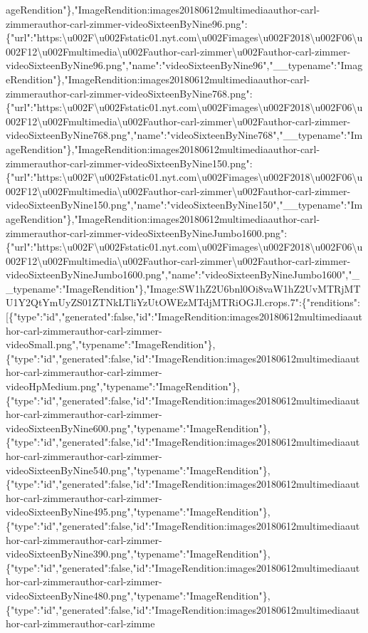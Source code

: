 ageRendition"\},"ImageRendition:images20180612multimediaauthor-carl-zimmerauthor-carl-zimmer-videoSixteenByNine96.png":\{"url":"https:\textbackslash{}u002F\textbackslash{}u002Fstatic01.nyt.com\textbackslash{}u002Fimages\textbackslash{}u002F2018\textbackslash{}u002F06\textbackslash{}u002F12\textbackslash{}u002Fmultimedia\textbackslash{}u002Fauthor-carl-zimmer\textbackslash{}u002Fauthor-carl-zimmer-videoSixteenByNine96.png","name":"videoSixteenByNine96","\_\_typename":"ImageRendition"\},"ImageRendition:images20180612multimediaauthor-carl-zimmerauthor-carl-zimmer-videoSixteenByNine768.png":\{"url":"https:\textbackslash{}u002F\textbackslash{}u002Fstatic01.nyt.com\textbackslash{}u002Fimages\textbackslash{}u002F2018\textbackslash{}u002F06\textbackslash{}u002F12\textbackslash{}u002Fmultimedia\textbackslash{}u002Fauthor-carl-zimmer\textbackslash{}u002Fauthor-carl-zimmer-videoSixteenByNine768.png","name":"videoSixteenByNine768","\_\_typename":"ImageRendition"\},"ImageRendition:images20180612multimediaauthor-carl-zimmerauthor-carl-zimmer-videoSixteenByNine150.png":\{"url":"https:\textbackslash{}u002F\textbackslash{}u002Fstatic01.nyt.com\textbackslash{}u002Fimages\textbackslash{}u002F2018\textbackslash{}u002F06\textbackslash{}u002F12\textbackslash{}u002Fmultimedia\textbackslash{}u002Fauthor-carl-zimmer\textbackslash{}u002Fauthor-carl-zimmer-videoSixteenByNine150.png","name":"videoSixteenByNine150","\_\_typename":"ImageRendition"\},"ImageRendition:images20180612multimediaauthor-carl-zimmerauthor-carl-zimmer-videoSixteenByNineJumbo1600.png":\{"url":"https:\textbackslash{}u002F\textbackslash{}u002Fstatic01.nyt.com\textbackslash{}u002Fimages\textbackslash{}u002F2018\textbackslash{}u002F06\textbackslash{}u002F12\textbackslash{}u002Fmultimedia\textbackslash{}u002Fauthor-carl-zimmer\textbackslash{}u002Fauthor-carl-zimmer-videoSixteenByNineJumbo1600.png","name":"videoSixteenByNineJumbo1600","\_\_typename":"ImageRendition"\},"Image:SW1hZ2U6bnl0Oi8vaW1hZ2UvMTRjMTU1Y2QtYmUyZS01ZTNkLTliYzUtOWEzMTdjMTRiOGJl.crops.7":\{"renditions":{[}\{"type":"id","generated":false,"id":"ImageRendition:images20180612multimediaauthor-carl-zimmerauthor-carl-zimmer-videoSmall.png","typename":"ImageRendition"\},\{"type":"id","generated":false,"id":"ImageRendition:images20180612multimediaauthor-carl-zimmerauthor-carl-zimmer-videoHpMedium.png","typename":"ImageRendition"\},\{"type":"id","generated":false,"id":"ImageRendition:images20180612multimediaauthor-carl-zimmerauthor-carl-zimmer-videoSixteenByNine600.png","typename":"ImageRendition"\},\{"type":"id","generated":false,"id":"ImageRendition:images20180612multimediaauthor-carl-zimmerauthor-carl-zimmer-videoSixteenByNine540.png","typename":"ImageRendition"\},\{"type":"id","generated":false,"id":"ImageRendition:images20180612multimediaauthor-carl-zimmerauthor-carl-zimmer-videoSixteenByNine495.png","typename":"ImageRendition"\},\{"type":"id","generated":false,"id":"ImageRendition:images20180612multimediaauthor-carl-zimmerauthor-carl-zimmer-videoSixteenByNine390.png","typename":"ImageRendition"\},\{"type":"id","generated":false,"id":"ImageRendition:images20180612multimediaauthor-carl-zimmerauthor-carl-zimmer-videoSixteenByNine480.png","typename":"ImageRendition"\},\{"type":"id","generated":false,"id":"ImageRendition:images20180612multimediaauthor-carl-zimmerauthor-carl-zimme